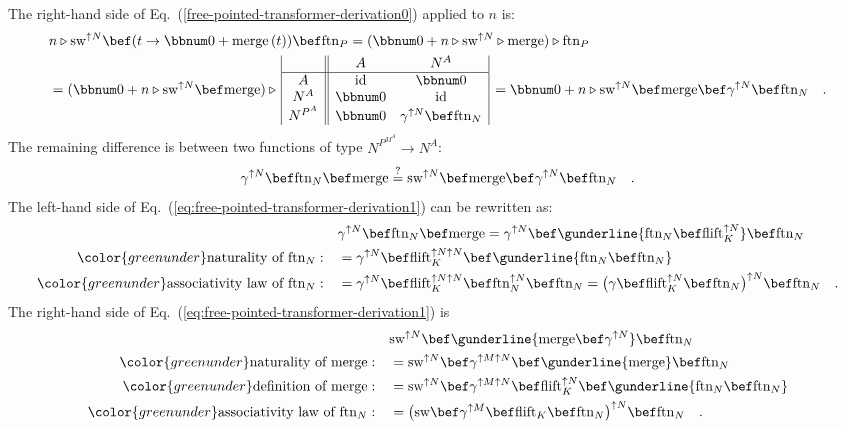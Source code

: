 The right-hand side of Eq.~(\ref{free-pointed-transformer-derivation0})
applied to $n$ is:
\begin{align*}
 & n\triangleright\text{sw}^{\uparrow N}\bef(t\rightarrow\bbnum 0+\text{merge}\,(t))\bef\text{ftn}_{P}=(\bbnum 0+n\triangleright\text{sw}^{\uparrow N}\triangleright\text{merge})\triangleright\text{ftn}_{P}\\
 & =(\bbnum 0+n\triangleright\text{sw}^{\uparrow N}\bef\text{merge})\triangleright\,\begin{array}{|c||cc|}
 & A & N^{A}\\
\hline A & \text{id} & \bbnum 0\\
N^{A} & \bbnum 0 & \text{id}\\
N^{P^{A}} & \bbnum 0 & \gamma^{\uparrow N}\bef\text{ftn}_{N}
\end{array}\,=\bbnum 0+n\triangleright\text{sw}^{\uparrow N}\bef\text{merge}\bef\gamma^{\uparrow N}\bef\text{ftn}_{N}\quad.
\end{align*}
The remaining difference is between two functions of type $N^{P^{M^{A}}}\rightarrow N^{A}$:
\begin{equation}
\gamma^{\uparrow N}\bef\text{ftn}_{N}\bef\text{merge}\overset{?}{=}\text{sw}^{\uparrow N}\bef\text{merge}\bef\gamma^{\uparrow N}\bef\text{ftn}_{N}\quad.\label{eq:free-pointed-transformer-derivation1}
\end{equation}
The left-hand side of Eq.~(\ref{eq:free-pointed-transformer-derivation1})
can be rewritten as:
\begin{align*}
 & \gamma^{\uparrow N}\bef\text{ftn}_{N}\bef\text{merge}=\gamma^{\uparrow N}\bef\gunderline{\text{ftn}_{N}\bef\text{flift}_{K}^{\uparrow N}}\bef\text{ftn}_{N}\\
{\color{greenunder}\text{naturality of }\text{ftn}_{N}:}\quad & =\gamma^{\uparrow N}\bef\text{flift}_{K}^{\uparrow N\uparrow N}\bef\gunderline{\text{ftn}_{N}\bef\text{ftn}_{N}}\\
{\color{greenunder}\text{associativity law of }\text{ftn}_{N}:}\quad & =\gamma^{\uparrow N}\bef\text{flift}_{K}^{\uparrow N\uparrow N}\bef\text{ftn}_{N}^{\uparrow N}\bef\text{ftn}_{N}=\big(\gamma\bef\text{flift}_{K}^{\uparrow N}\bef\text{ftn}_{N}\big)^{\uparrow N}\bef\text{ftn}_{N}\quad.
\end{align*}
The right-hand side of Eq.~(\ref{eq:free-pointed-transformer-derivation1})
is
\begin{align*}
 & \text{sw}^{\uparrow N}\bef\gunderline{\text{merge}\bef\gamma^{\uparrow N}}\bef\text{ftn}_{N}\\
{\color{greenunder}\text{naturality of }\text{merge}:}\quad & =\text{sw}^{\uparrow N}\bef\gamma^{\uparrow M\uparrow N}\bef\gunderline{\text{merge}}\bef\text{ftn}_{N}\\
{\color{greenunder}\text{definition of }\text{merge}:}\quad & =\text{sw}^{\uparrow N}\bef\gamma^{\uparrow M\uparrow N}\bef\text{flift}_{K}^{\uparrow N}\bef\gunderline{\text{ftn}_{N}\bef\text{ftn}_{N}}\\
{\color{greenunder}\text{associativity law of }\text{ftn}_{N}:}\quad & =\big(\text{sw}\bef\gamma^{\uparrow M}\bef\text{flift}_{K}\bef\text{ftn}_{N}\big)^{\uparrow N}\bef\text{ftn}_{N}\quad.
\end{align*}
